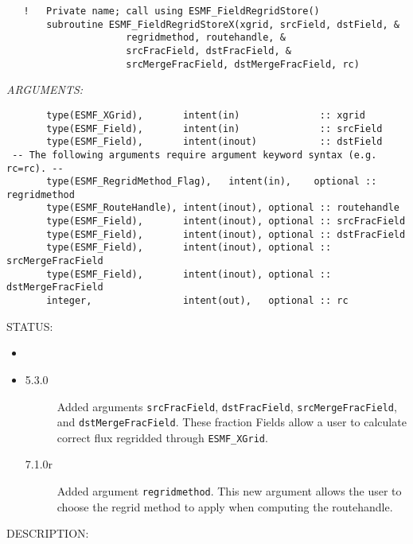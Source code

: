   
\begin{verbatim}   !   Private name; call using ESMF_FieldRegridStore()
       subroutine ESMF_FieldRegridStoreX(xgrid, srcField, dstField, &
                     regridmethod, routehandle, &
                     srcFracField, dstFracField, &
                     srcMergeFracField, dstMergeFracField, rc)
        \end{verbatim}{\em ARGUMENTS:}
\begin{verbatim}       type(ESMF_XGrid),       intent(in)              :: xgrid
       type(ESMF_Field),       intent(in)              :: srcField
       type(ESMF_Field),       intent(inout)           :: dstField
 -- The following arguments require argument keyword syntax (e.g. rc=rc). --
       type(ESMF_RegridMethod_Flag),   intent(in),    optional :: regridmethod
       type(ESMF_RouteHandle), intent(inout), optional :: routehandle
       type(ESMF_Field),       intent(inout), optional :: srcFracField
       type(ESMF_Field),       intent(inout), optional :: dstFracField
       type(ESMF_Field),       intent(inout), optional :: srcMergeFracField
       type(ESMF_Field),       intent(inout), optional :: dstMergeFracField
       integer,                intent(out),   optional :: rc \end{verbatim}
{\sf STATUS:}
   \begin{itemize}
   \item{}
   \item{}
   \begin{description}
   \item[5.3.0] Added arguments {\tt srcFracField}, {\tt dstFracField}, {\tt srcMergeFracField}, and {\tt dstMergeFracField}.
   These fraction Fields allow a user to calculate correct flux regridded through {\tt ESMF\_XGrid}.
   \item[7.1.0r] Added argument {\tt regridmethod}. This new argument allows the user to choose the regrid method
                 to apply when computing the routehandle. 
   \end{description}
   \end{itemize}
  
{\sf DESCRIPTION:\\ }


